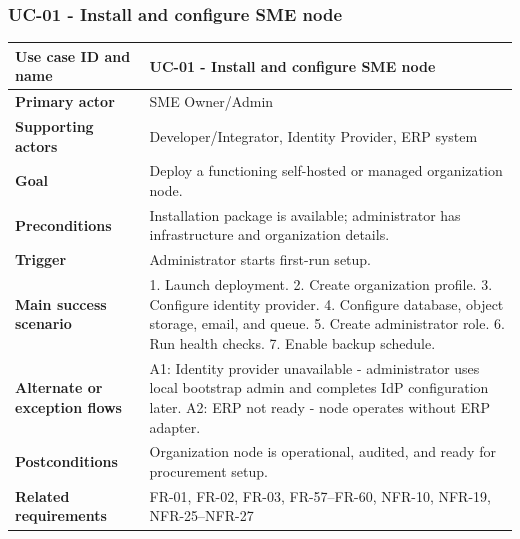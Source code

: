 \documentclass[11pt,a4paper]{article}
\begin{document}
\subsubsection{UC-01 - Install and configure SME node}
\begin{footnotesize}
\begin{longtable}{@{}p{}p{}@{}}
\rowcolor{gray!10}\textbf{Use case ID and name} & UC-01 - Install and configure SME node \\ \hline
\rowcolor{gray!10}\textbf{Primary actor} & SME Owner/Admin \\ \hline
\rowcolor{gray!10}\textbf{Supporting actors} & Developer/Integrator, Identity Provider, ERP system \\ \hline
\rowcolor{gray!10}\textbf{Goal} & Deploy a functioning self-hosted or managed organization node. \\ \hline
\rowcolor{gray!10}\textbf{Preconditions} & Installation package is available; administrator has infrastructure and organization details. \\ \hline
\rowcolor{gray!10}\textbf{Trigger} & Administrator starts first-run setup. \\ \hline
\rowcolor{gray!10}\textbf{Main success scenario} & 1. Launch deployment. 2. Create organization profile. 3. Configure identity provider. 4. Configure database, object storage, email, and queue. 5. Create administrator role. 6. Run health checks. 7. Enable backup schedule. \\ \hline
\rowcolor{gray!10}\textbf{Alternate or exception flows} & A1: Identity provider unavailable - administrator uses local bootstrap admin and completes IdP configuration later. A2: ERP not ready - node operates without ERP adapter. \\ \hline
\rowcolor{gray!10}\textbf{Postconditions} & Organization node is operational, audited, and ready for procurement setup. \\ \hline
\rowcolor{gray!10}\textbf{Related requirements} & FR-01, FR-02, FR-03, FR-57--FR-60, NFR-10, NFR-19, NFR-25--NFR-27 \\ \hline
\end{longtable}
\end{footnotesize}
\end{document}
